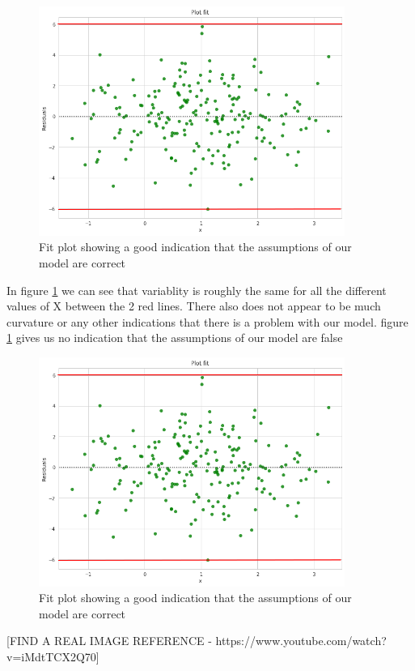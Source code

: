 \begin{figure}[H]
  \centering
  \includegraphics[scale=0.5,width=100mm]{./images/plotfit-good.png}
  \caption{Fit plot showing a good indication that the assumptions of our model are correct}
  \label{fig:fitsplotgood}
\end{figure}

In figure \ref{fig:fitsplotgood} we can see that variablity is roughly the same for all the different values of X between the 2 red lines. There also does not appear to be much curvature or any other indications that there is a problem with our model. figure \ref{fig:fitsplotgood} gives us no indication that the assumptions of our model are false


\begin{figure}[H]
  \centering
  \includegraphics[scale=0.5,width=100mm]{./images/plotfit-good.png}
  \caption{Fit plot showing a good indication that the assumptions of our model are correct}
  \label{fig:fitsplotbad}
\end{figure}

[FIND A REAL IMAGE REFERENCE - https://www.youtube.com/watch?v=iMdtTCX2Q70]


